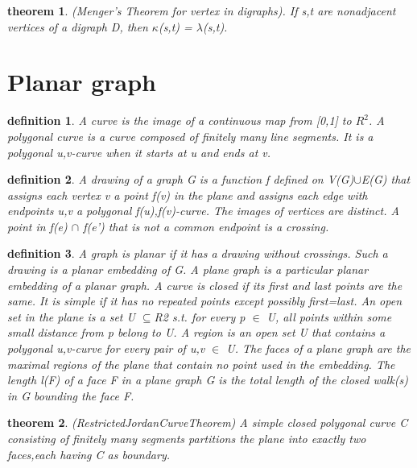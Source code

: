 \documentclass[twocolumn]{article}
\newtheorem{theorem}{theorem}[section]  %
\newtheorem{definition}{definition}
\begin{document}
\begin{CJK*}{UTF8}{bkai}
    \begin{theorem}{(Menger's Theorem for vertex in digraphs).}
         If s,t are nonadjacent vertices of a digraph D, then $\kappa$(s,t) = $\lambda$(s,t).
    \end{theorem}

\section{Planar graph}
    \begin{definition}
       A curve is the image of a continuous map from [0,1] to ${R}^{2}$. A polygonal curve
 is a curve composed of finitely many line segments. It is a polygonal u,v-curve
 when it starts at u and ends at v.
    \end{definition}

    \begin{definition}
        A drawing of a graph G is a function f defined on V(G)$\cup $E(G) that assigns
 each vertex v a point f(v) in the plane and assigns each edge with endpoints
 u,v a polygonal f(u),f(v)-curve. The images of vertices are distinct. A point
 in f(e) $\cap $ f(e') that is not a common endpoint is a crossing.
    \end{definition}

    \begin{definition}
        A graph is planar if it has a drawing without crossings. Such a drawing is a
 planar embedding of G. A plane graph is a particular planar embedding of a
 planar graph.
 A curve is closed if its first and last points are the same. It is simple if it has
 no repeated points except possibly first=last. An open set in the plane is a set
 U $\subseteq $R2 s.t. for every p $\in$ U, all points within some small distance from p
 belong to U. A region is an open set U that contains a polygonal u,v-curve
 for every pair of u,v $\in$ U.
 The faces of a plane graph are the maximal regions of the plane that contain
 no point used in the embedding.
 The length l(F) of a face F in a plane graph G is the total length of the
 closed walk(s) in G bounding the face F.
    \end{definition}

    \begin{theorem}{(RestrictedJordanCurveTheorem)}
         A simple closed polygonal curve C consisting of finitely many segments
 partitions the plane into exactly two faces,each having C as boundary.
    \end{theorem}


\end{CJK*}
\end{document}

